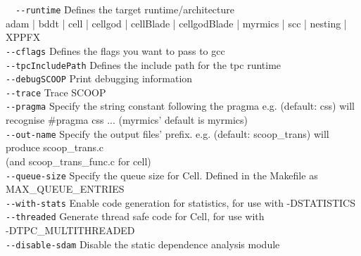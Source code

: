 \documentclass[
a4paper,
12pt,
]{article}
\begin{document}
  \begin{tabbing}
  \ \ \=\verb!--runtime!\hspace{9em} \=
  Defines the target runtime/architecture\\
                                    \>\>adam | bddt | cell | cellgod | cellBlade | cellgodBlade | myrmics | scc | nesting | XPPFX\\[1ex]
  \>\verb!--cflags!                   \>Defines the flags you want to pass to gcc\\[1ex]
  \>\verb!--tpcIncludePath!           \>Defines the include path for the tpc runtime\\[1ex]
  \>\verb!--debugSCOOP!               \>Print debugging information\\[1ex]
  \>\verb!--trace!                    \>Trace SCOOP\\[1ex]
  \>\verb!--pragma!                   \>Specify the string constant following the pragma e.g. (default: css) will recognise \#pragma css ... (myrmics' default is myrmics)\\[1ex]
  \>\verb!--out-name!                 \>Specify the output files' prefix. e.g. (default: scoop\_trans) will produce scoop\_trans.c\\
                                    \>\>(and scoop\_trans\_func.c for cell)\\[1ex]
  \>\verb!--queue-size!               \>Specify the queue size for Cell. Defined in the Makefile as\\
                                    \>\>MAX\_QUEUE\_ENTRIES\\[1ex]
  \>\verb!--with-stats!               \>Enable code generation for statistics, for use with -DSTATISTICS\\[1ex]
  \>\verb!--threaded!                 \>Generate thread safe code for Cell, for use with\\
                                    \>\>-DTPC\_MULTITHREADED\\[1ex]
  \>\verb!--disable-sdam!             \>Disable the static dependence analysis module
  \end{tabbing}
\end{document}
